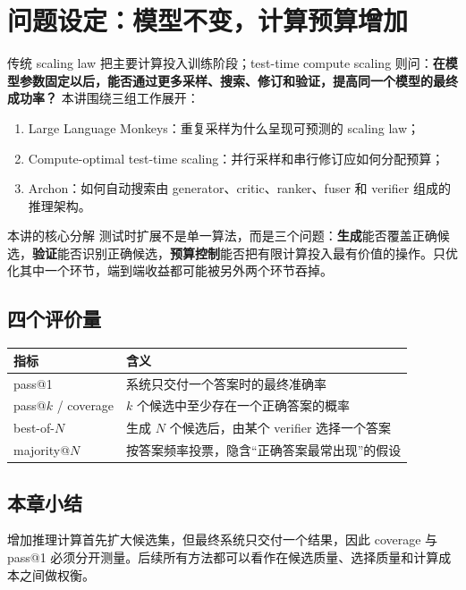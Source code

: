 \section{问题设定：模型不变，计算预算增加}

传统 scaling law 把主要计算投入训练阶段；test-time compute scaling 则问：\textbf{在模型参数固定以后，能否通过更多采样、搜索、修订和验证，提高同一个模型的最终成功率？} 本讲围绕三组工作展开：

\begin{enumerate}
    \item Large Language Monkeys：重复采样为什么呈现可预测的 scaling law；
    \item Compute-optimal test-time scaling：并行采样和串行修订应如何分配预算；
    \item Archon：如何自动搜索由 generator、critic、ranker、fuser 和 verifier 组成的推理架构。
\end{enumerate}

\begin{importantbox}{本讲的核心分解}
测试时扩展不是单一算法，而是三个问题：\textbf{生成}能否覆盖正确候选，\textbf{验证}能否识别正确候选，\textbf{预算控制}能否把有限计算投入最有价值的操作。只优化其中一个环节，端到端收益都可能被另外两个环节吞掉。
\end{importantbox}

\subsection{四个评价量}

\begin{table}[H]
\centering
\begin{tabular}{p{3.1cm}p{10.5cm}}
\toprule
\textbf{指标} & \textbf{含义} \\
\midrule
pass@1 & 系统只交付一个答案时的最终准确率 \\
pass@$k$ / coverage & $k$ 个候选中至少存在一个正确答案的概率 \\
best-of-$N$ & 生成 $N$ 个候选后，由某个 verifier 选择一个答案 \\
majority@$N$ & 按答案频率投票，隐含“正确答案最常出现”的假设 \\
\bottomrule
\end{tabular}
\end{table}

\subsection{本章小结}

增加推理计算首先扩大候选集，但最终系统只交付一个结果，因此 coverage 与 pass@1 必须分开测量。后续所有方法都可以看作在候选质量、选择质量和计算成本之间做权衡。

